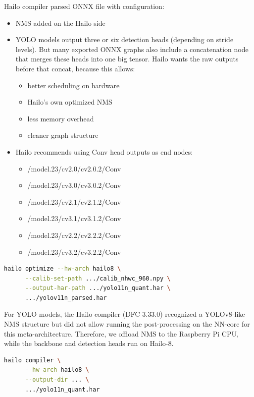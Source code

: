 \documentclass[12pt,a4paper]{report}
\begin{document}
    Hailo compiler parsed ONNX file with configuration:
    \begin{itemize}
        \item NMS added on the Hailo side
        \item YOLO models output three or six detection heads (depending on stride levels). But many exported
    ONNX graphs also include a concatenation node that merges these heads into one big tensor.
    Hailo wants the raw outputs before that concat, because this allows:

            \begin{itemize}
                \item better scheduling on hardware
                \item Hailo’s own optimized NMS
                \item less memory overhead
                \item cleaner graph structure
            \end{itemize}

        \item Hailo recommends using Conv head outputs as end nodes:

            \begin{itemize}
                \item /model.23/cv2.0/cv2.0.2/Conv
                \item /model.23/cv3.0/cv3.0.2/Conv
                \item /model.23/cv2.1/cv2.1.2/Conv
                \item /model.23/cv3.1/cv3.1.2/Conv
                \item /model.23/cv2.2/cv2.2.2/Conv
                \item /model.23/cv3.2/cv3.2.2/Conv
            \end{itemize}

    \end{itemize}

    \begin{lstlisting}[language=bash,caption={Hailo optimization with calibration set},label={lst:hailo-optimize}]
    hailo optimize --hw-arch hailo8 \
      --calib-set-path .../calib_nhwc_960.npy \
      --output-har-path .../yolo11n_quant.har \
      .../yolov11n_parsed.har
    \end{lstlisting}

    For YOLO models, the Hailo compiler (DFC 3.33.0) recognized a YOLOv8-like NMS structure but did not allow
    running the post-processing on the NN-core for this meta-architecture.
    Therefore, we offload NMS to the Raspberry Pi CPU, while the backbone and detection heads run on Hailo-8.


    \begin{lstlisting}[language=bash,caption={Compile quantized YOLO11n HAR to HEF on Hailo-8}]
    hailo compiler \
      --hw-arch hailo8 \
      --output-dir ... \
      .../yolo11n_quant.har
    \end{lstlisting}
\end{document}

